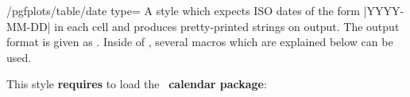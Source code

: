 \begin{stylekey}{/pgfplots/table/date type=}%
	A style which expects ISO dates of the form |YYYY-MM-DD| in each cell and produces pretty-printed strings on output. The output format is given as . Inside of , several macros which are explained below can be used.
\begin{codeexample}[]

%

\hspace{1cm}
\end{codeexample}
	This style \textbf{requires} to load the \PGF\  \textbf{calendar package}:
\begin{codeexample}
\usepackage{pgfcalendar}
\end{codeexample}


\end{stylekey}
